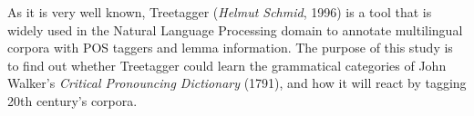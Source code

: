 As it is very well known, Treetagger (\textit{Helmut Schmid}, 1996) is a tool that is widely used in the Natural Language Processing domain to annotate multilingual corpora with POS taggers and lemma information. The purpose of this study is to find out whether Treetagger could learn the grammatical categories of John Walker's \textit{Critical Pronouncing Dictionary }(1791), and how it will react by tagging 20th century's corpora. 
